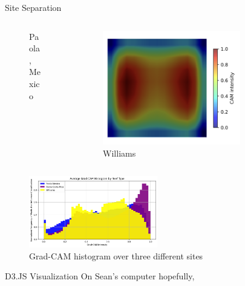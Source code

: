 \begin{frame}{Site Separation}
\begin{columns}
\begin{column}{0.25\textwidth}
\begin{figure}
                \caption{Paola, Mexico}
            \end{figure}
        \end{column}
        \begin{column}{0.25\textwidth}
            \begin{figure}
                \centering
                \includegraphics[height=0.2\textheight,width=0.75\textwidth,keepaspectratio]{images/WilliamsNonDegraded.png}
                \caption{Williams}
            \end{figure}
        \end{column}
    \end{columns}
    \begin{figure}
        \centering
        \includegraphics[height=0.25\textheight,width=0.5\textwidth,keepaspectratio]{images/gradcamsitesep.jpg}
        \caption{Grad-CAM histogram over three different sites}
    \end{figure}
\end{frame}

\begin{frame}{D3.JS Visualization}
    On Sean's computer hopefully, \href{graph}{} \href{spectrogram}{}
\end{frame}